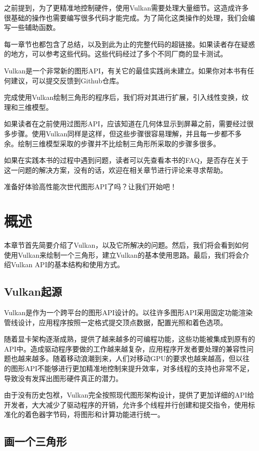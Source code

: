 \documentclass{ctexart}
\begin{document}
之前提到，为了更精准地控制硬件，使用Vulkan需要处理大量细节。这造成许多很基础的操作也需要编写很多代码才能完成。为了简化这类操作的处理，我们会编写一些辅助函数。

每一章节也都包含了总结，以及到此为止的完整代码的超链接。如果读者存在疑惑的地方，可以参考这些代码。这些代码经过了多个不同厂商的显卡测试。

Vulkan是一个非常新的图形API，有关它的最佳实践尚未建立。如果你对本书有任何建议，可以提交反馈到Github仓库。

完成使用Vulkan绘制三角形的程序后，我们将对其进行扩展，引入线性变换，纹理和三维模型。

如果读者在之前使用过图形API，应该知道在几何体显示到屏幕之前，需要经过很多步骤。使用Vulkan同样是这样，但这些步骤很容易理解，并且每一步都不多余。绘制三维模型采取的步骤并不比绘制三角形所采取的步骤多很多。

如果在实践本书的过程中遇到问题，读者可以先查看本书的FAQ，是否存在关于这一问题的解决方案，没有的话，欢迎在相关章节进行评论来寻求帮助。

准备好体验高性能次世代图形API了吗？让我们开始吧！

\newpage
\section{概述}
本章节首先简要介绍了Vulkan，以及它所解决的问题。然后，我们将会看到如何使用Vulkan来绘制一个三角形，建立Vulkan的基本使用思路。最后，我们将会介绍Vulkan API的基本结构和使用方式。

\subsection{Vulkan起源}

Vulkan是作为一个跨平台的图形API设计的。以往许多图形API采用固定功能渲染管线设计，应用程序按照一定格式提交顶点数据，配置光照和着色选项。

随着显卡架构逐渐成熟，提供了越来越多的可编程功能，这些功能被集成到原有的API中。造成驱动程序要做的工作越来越复杂，应用程序开发者要处理的兼容性问题也越来越多。随着移动浪潮到来，人们对移动GPU的要求也越来越高，但以往的图形API不能够进行更加精准地控制来提升效率，对多线程的支持也非常不足，导致没有发挥出图形硬件真正的潜力。

由于没有历史包袱，Vulkan完全按照现代图形架构设计，提供了更加详细的API给开发者，大大减少了驱动程序的开销，允许多个线程并行创建和提交指令，使用标准化的着色器字节码，将图形和计算功能进行统一。

\subsection{画一个三角形}
\end{document}
